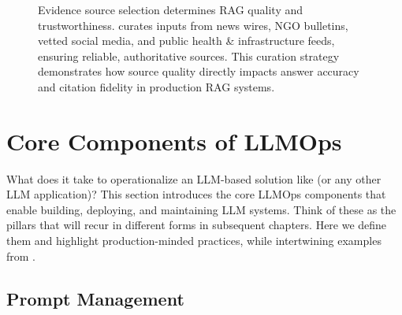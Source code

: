 \begin{figure}[tb]
\begin{llmfigbox}
\end{llmfigbox}
\caption{Evidence source selection determines RAG quality and trustworthiness. \ishtar{} curates inputs from news wires, NGO bulletins, vetted social media, and public health \& infrastructure feeds, ensuring reliable, authoritative sources. This curation strategy demonstrates how source quality directly impacts answer accuracy and citation fidelity in production RAG systems.}
\label{fig:ch01_ishtar_inputs_taxonomy}
\end{figure}





\section{Core Components of LLMOps}
\label{sec:core-llmops}

What does it take to operationalize an LLM-based solution like \ishtar{} (or any other LLM application)? This section introduces the core LLMOps components that enable building, deploying, and maintaining LLM systems. Think of these as the pillars that will recur in different forms in subsequent chapters. Here we define them and highlight production-minded practices, while intertwining examples from \ishtar{}.

\subsection{Prompt Management}
\label{subsec:prompt-mgmt}

